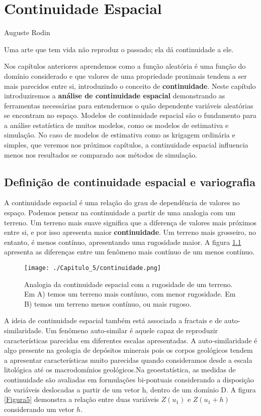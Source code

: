 \chapter{Continuidade Espacial}

\begin{myquoting}{Auguste Rodin}
	
	Uma arte que tem vida não reproduz o passado; ela dá continuidade a ele.
\end{myquoting}

Nos capítulos anteriores aprendemos como a função aleatória é uma função do domínio considerado e que valores de uma propriedade proximais tendem a ser mais parecidos entre si, introduzindo o conceito de \textbf{continuidade}. Neste capítulo introduziremos a \textbf{análise de continuidade espacial} demonstrando as ferramentas necessárias para entendermos o quão dependente variáveis aleatórias se encontram no espaço. Modelos de continuidade espacial são o fundamento para a análise estatística de muitos modelos, como os modelos de estimativa e simulação. No caso de modelos de estimativa como as krigagem ordinária e simples, que veremos nos próximos capítulos, a continuidade espacial influencia menos nos resultados se comparado aos métodos de simulação. 

\section{Definição de continuidade espacial e variografia}

A continuidade espacial é uma relação do grau de dependência de valores no espaço. Podemos pensar na continuidade a partir de uma analogia com um terreno. Um terreno mais suave significa que a diferença de valores mais próximos entre si, e por isso apresenta maior \textbf{continuidade}. Um terreno mais grosseiro, no entanto, é menos contínuo, apresentando uma rugosidade maior. A figura \ref{Figura_cont} apresenta as diferenças entre um fenômeno mais contínuo de um menos contínuo. 

\FloatBarrier
\begin{figure}[!htb]
	\centering
	\texttt{[image: ./Capitulo\_5/continuidade.png]}
	\caption{Analogia da continuidade espacial com a rugosidade de um terreno. Em A) temos um terreno mais contínuo, com menor rugosidade. Em B) temos um terreno menos contínuo, ou mais rugoso.}
	\label{Figura_cont}
\end{figure}
\FloatBarrier

A ideia de continuidade espacial também está associada a fractais e de auto-similaridade. Um fenômeno auto-similar é aquele capaz de reproduzir características parecidas em diferentes escalas apresentadas. A auto-similaridade é algo presente na geologia de depósitos minerais pois os corpos geológicos tendem a apresentar características muito parecidas quando consideramos desde a escala litológica até os macrodomínios geológicos.Na geoestatística, as medidas de continuidade são avaliadas em formulações bi-pontuais considerando a disposição de variáveis deslocadas a partir de um vetor h, dentro de um domínio D. A figura \ref{Figura5} demonstra a relação entre duas variáveis $Z(u_{1})$ e $Z(u_{1} + h)$ considerando um vetor $h$. 

